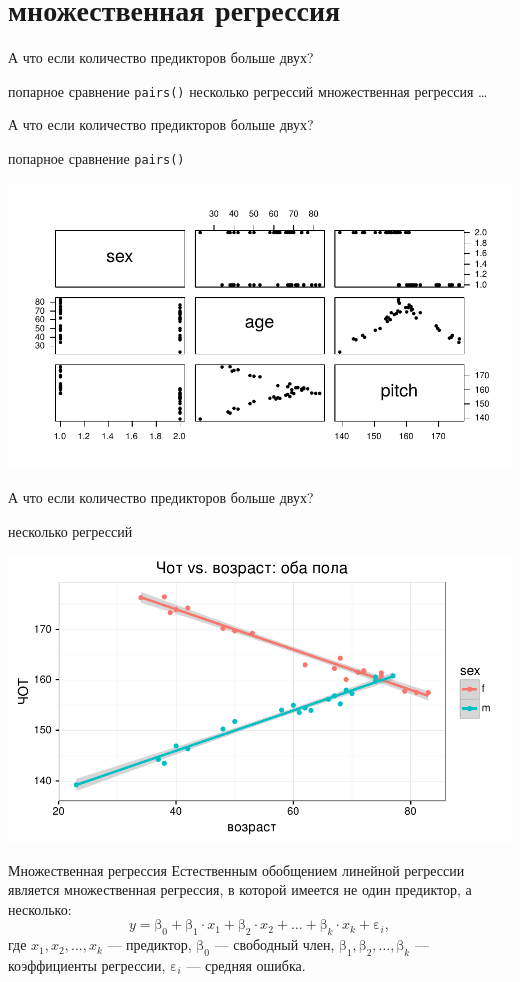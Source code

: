 \section{множественная регрессия}
\begin{frame}{А что если количество предикторов больше двух?}
\begin{itemize}
\mytem попарное сравнение \scriptsize\verb"pairs()"\normalsize
\mytem несколько регрессий
\mytem множественная регрессия
\mytem …
\end{itemize}
\end{frame}
\begin{frame}{А что если количество предикторов больше двух?}
\begin{itemize}
\mytem попарное сравнение \scriptsize\verb"pairs()"\normalsize
\end{itemize}
\includegraphics[width=\linewidth]{pairs.pdf}
\end{frame}
\begin{frame}{А что если количество предикторов больше двух?}
\begin{itemize}
\mytem несколько регрессий
\end{itemize}
\includegraphics[width=\linewidth]{tworegr.pdf}
\end{frame}
\begin{frame}{Множественная регрессия}
Естественным обобщением линейной регрессии является множественная регрессия, в которой имеется не один предиктор, а несколько:
\vfill
$$y=\mbox{β}_0+\mbox{β}_1\cdot x_1+\mbox{β}_2\cdot x_2 + \dots +\mbox{β}_k\cdot x_k +\mbox{ε}_i,$$
где $x_1, x_2, \dots, x_k$  — предиктор, $\mbox{β}_0$  — свободный член, $\mbox{β}_1, \mbox{β}_2, \dots, \mbox{β}_k$  — коэффициенты регрессии, $\mbox{ε}_i$  — средняя ошибка.
\end{frame}
